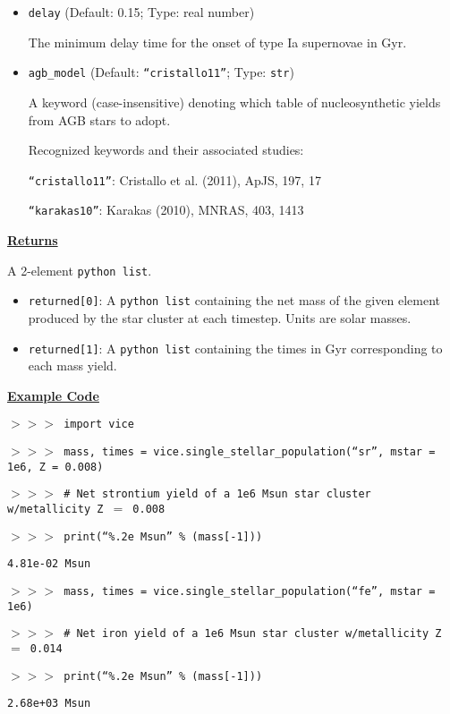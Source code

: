\documentclass{report}
\begin{document}
\begin{itemize}
	\item{
		\texttt{delay} (Default: 0.15; Type: real number) 
		\par
		The minimum delay time for the onset of type Ia supernovae in Gyr. 
	}

	\item{
		\texttt{agb\_model} (Default: \texttt{``cristallo11''}; Type: 
		\texttt{str}) 
		\par 
		A keyword (case-insensitive) denoting which table of nucleosynthetic 
		yields from AGB stars to adopt. 
		\par
		Recognized keywords and their associated studies: 
		\par\qquad 
		\texttt{``cristallo11''}: Cristallo et al. (2011), ApJS, 197, 17 
		\par\qquad 
		\texttt{``karakas10''}: Karakas (2010), MNRAS, 403, 1413 
	}
\end{itemize}

\par\null\par\noindent 
\underline{\textbf{Returns}} 
\par\noindent 
A 2-element \texttt{python list}. 
\begin{itemize} 
	\item{
		\texttt{returned[0]}: A \texttt{python list} containing the net mass 
		of the given element produced by the star cluster at each timestep. 
		Units are solar masses. 
	}

	\item{
		\texttt{returned[1]}: A \texttt{python list} containing the times in 
		Gyr corresponding to each mass yield. 
	}
\end{itemize} 

\par\null\par\noindent 
\underline{\textbf{Example Code}} 
\par\noindent 
\texttt{$>>>$ import vice} \par\noindent 
\texttt{$>>>$ mass, times = vice.single\_stellar\_population(``sr'', 
mstar = 1e6, Z = 0.008)} \par\noindent 
\texttt{$>>>$ \# Net strontium yield of a 1e6 Msun star cluster w/metallicity 
Z $=$ 0.008} \par\noindent 
\texttt{$>>>$ print(``\%.2e Msun'' \% (mass[-1]))} \par\noindent 
\texttt{4.81e-02 Msun} \par\noindent 
\texttt{$>>>$ mass, times = vice.single\_stellar\_population(``fe'', 
mstar = 1e6)} \par\noindent 
\texttt{$>>>$ \# Net iron yield of a 1e6 Msun star cluster w/metallicity 
Z $=$ 0.014} \par\noindent 
\texttt{$>>>$ print(``\%.2e Msun'' \% (mass[-1]))} \par\noindent 
\texttt{2.68e+03 Msun} \par\noindent  
\end{document}
